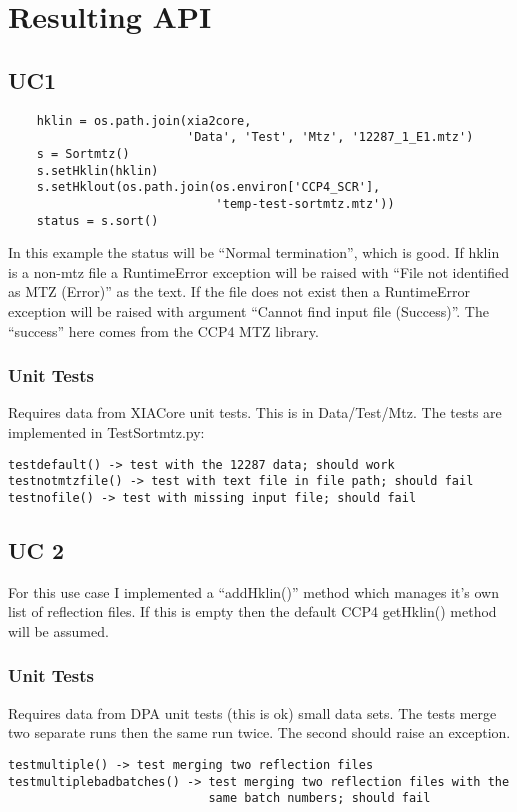 \documentclass[a4paper, 11pt]{article}
\begin{document}
\section{Resulting API}

\subsection{UC1}

{
\tiny
\begin{verbatim}
    hklin = os.path.join(xia2core,
                         'Data', 'Test', 'Mtz', '12287_1_E1.mtz')
    s = Sortmtz()
    s.setHklin(hklin)
    s.setHklout(os.path.join(os.environ['CCP4_SCR'],
                             'temp-test-sortmtz.mtz'))
    status = s.sort()
\end{verbatim}
}

In this example the status will be ``Normal termination'', which is good.
If hklin is a non-mtz file a RuntimeError exception will be raised with
``File not identified as MTZ (Error)'' as the text. If the file does 
not exist then a RuntimeError exception will be raised with argument
``Cannot find input file (Success)''. The ``success'' here comes from the 
CCP4 MTZ library.

\subsubsection{Unit Tests}

Requires data from XIACore unit tests. This is in Data/Test/Mtz.
The tests are implemented in TestSortmtz.py:

{
\tiny
\begin{verbatim}
testdefault() -> test with the 12287 data; should work
testnotmtzfile() -> test with text file in file path; should fail
testnofile() -> test with missing input file; should fail
\end{verbatim}
}

\subsection{UC 2}

For this use case I implemented a ``addHklin()'' method which manages
it's own list of reflection files. If this is empty then the default CCP4
getHklin() method will be assumed.

\subsubsection{Unit Tests}

Requires data from DPA unit tests (this is ok) small data sets. The tests
merge two separate runs then the same run twice. The second should raise
an exception.

{
\tiny
\begin{verbatim}
testmultiple() -> test merging two reflection files
testmultiplebadbatches() -> test merging two reflection files with the 
                            same batch numbers; should fail
\end{verbatim}
}
\end{document}
